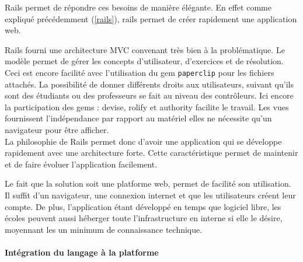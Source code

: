 Rails permet de répondre ces besoins de manière élégante. En effet comme expliqué précédemment (\ref{rails}), rails permet de créer rapidement une application web.

Rails fourni une architecture MVC convenant très bien à la problématique. Le modèle permet de gérer les concepts d'utilisateur, d'exercices et de résolution. Ceci est encore facilité avec l'utilisation du gem \texttt{paperclip} pour les fichiers attachés.  La possibilité de donner différents droits aux utilisateurs, suivant qu'ils sont des étudiants ou des professeurs se fait au niveau des contrôleurs. Ici encore la participation des gems : devise, rolify et authority facilite le travail. Les vues fournissent l'indépendance par rapport au matériel elles ne nécessite qu'un navigateur pour être afficher.\\

La philosophie de Rails permet donc d'avoir une application qui se développe rapidement avec une architecture forte. Cette caractéristique permet de maintenir et de faire évoluer l'application facilement.

Le fait que la solution soit une platforme web, permet de facilité son utilisation. Il suffit d'un navigateur, une connexion internet et que les utilisateurs créent leur compte. De plus, l'application étant développé en temps que logiciel libre, les écoles peuvent aussi héberger toute l'infrastructure en interne si elle le désire, moyennant les un minimum de connaissance technique.

\paragraph{Intégration du langage à la platforme}
